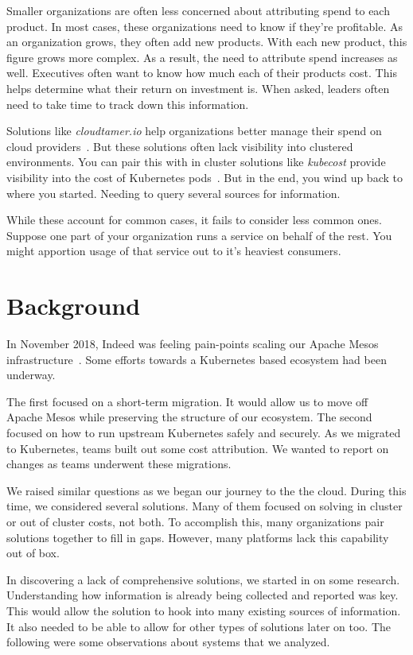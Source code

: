 \documentclass[10pt, a4paper, twocolumn]{article}
\begin{document}
  Smaller organizations are often less concerned about attributing spend to each product.
  In most cases, these organizations need to know if they're profitable.
  As an organization grows, they often add new products.
  With each new product, this figure grows more complex.
  As a result, the need to attribute spend increases as well.
  Executives often want to know how much each of their products cost.
  This helps determine what their return on investment is.
  When asked, leaders often need to take time to track down this information.

  Solutions like \textit{cloudtamer.io} help organizations better manage their spend on cloud providers~\cite{cloudtamer}.
  But these solutions often lack visibility into clustered environments.
  You can pair this with in cluster solutions like \textit{kubecost} provide visibility into the cost of Kubernetes pods~\cite{kubecost}.
  But in the end, you wind up back to where you started.
  Needing to query several sources for information.

  While these account for common cases, it fails to consider less common ones.
  Suppose one part of your organization runs a service on behalf of the rest.
  You might apportion usage of that service out to it's heaviest consumers.


\section*{Background}
  In November 2018, Indeed was feeling pain-points scaling our Apache Mesos infrastructure~\cite{mesos}.
  Some efforts towards a Kubernetes based ecosystem had been underway.

  The first focused on a short-term migration.
  It would allow us to move off Apache Mesos while preserving the structure of our ecosystem.
  The second focused on how to run upstream Kubernetes safely and securely.
  As we migrated to Kubernetes, teams built out some cost attribution.
  We wanted to report on changes as teams underwent these migrations.

  We raised similar questions as we began our journey to the the cloud.
  During this time, we considered several solutions.
  Many of them focused on solving in cluster or out of cluster costs, not both.
  To accomplish this, many organizations pair solutions together to fill in gaps.
  However, many platforms lack this capability out of box.

  In discovering a lack of comprehensive solutions, we started in on some research.
  Understanding how information is already being collected and reported was key.
  This would allow the solution to hook into many existing sources of information.
  It also needed to be able to allow for other types of solutions later on too.
  The following were some observations about systems that we analyzed.
\end{document}

